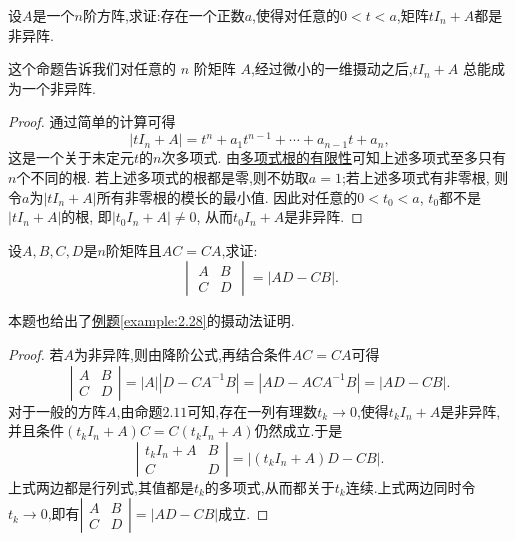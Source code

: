 \documentclass[lang=cn,newtx,10pt,scheme=chinese]{elegantbook}
\begin{document}
\begin{proposition}\label{proposition:摄动法基本命题}
设\(A\)是一个\(n\)阶方阵,求证:存在一个正数\(a\),使得对任意的\(0 < t < a\),矩阵\(tI_n+A\)都是非异阵. 
\end{proposition}
\begin{note}
这个命题告诉我们对任意的 \(n\) 阶矩阵 \(A\),经过微小的一维摄动之后,\(tI_n + A\) 总能成为一个非异阵.
\end{note}
\begin{proof}
通过简单的计算可得
\[
|tI_n + A| = t^n + a_1t^{n - 1}+\cdots+a_{n - 1}t + a_n,
\]
这是一个关于未定元\(t\)的\(n\)次多项式. 由\hyperref[proposition:多项式根的有限性]{多项式根的有限性}可知上述多项式至多只有\(n\)个不同的根. 若上述多项式的根都是零,则不妨取\(a = 1\);若上述多项式有非零根, 则令\(a\)为\(|tI_n + A|\)所有非零根的模长的最小值. 因此对任意的\(0 < t_0 < a\), \(t_0\)都不是\(|tI_n + A|\)的根, 即\(|t_0I_n + A|\neq0\), 从而\(t_0I_n + A\)是非异阵.
\end{proof}

\begin{example}
设\(A,B,C,D\)是\(n\)阶矩阵且\(AC = CA\),求证:
\[
\begin{vmatrix}
A & B\\
C & D
\end{vmatrix}=|AD - CB|.
\]
\end{example}
\begin{note}
本题也给出了\hyperref[example:2.28]{例题\ref{example:2.28}}的摄动法证明.
\end{note}
\begin{proof}
    若\(A\)为非异阵,则由降阶公式,再结合条件\(AC = CA\)可得
\[
\left|\begin{matrix}
A & B\\
C & D
\end{matrix}\right| = |A|\left|D - CA^{-1}B\right| = \left|AD - ACA^{-1}B\right| = |AD - CB|.
\]
对于一般的方阵\(A\),由命题\(2.11\)可知,存在一列有理数\(t_k\rightarrow 0\),使得\(t_kI_n + A\)是非异阵,并且条件\((t_kI_n + A)C = C(t_kI_n + A)\)仍然成立.于是
\[
\left|\begin{matrix}
t_kI_n + A & B\\
C & D
\end{matrix}\right| = \left|(t_kI_n + A)D - CB\right|.
\]
上式两边都是行列式,其值都是\(t_k\)的多项式,从而都关于\(t_k\)连续.上式两边同时令\(t_k\rightarrow 0\),即有\(\left|\begin{matrix}
A & B\\
C & D
\end{matrix}\right| = |AD - CB|\)成立.
\end{proof}
\end{document}
